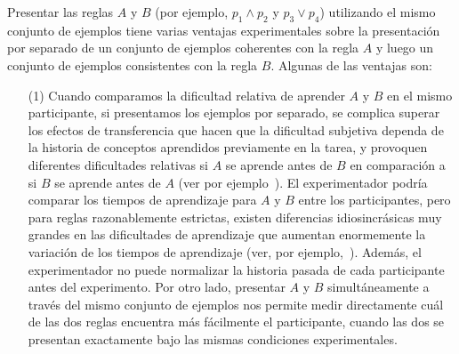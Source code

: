 Presentar las reglas $A$ y $B$ (por ejemplo, $p_1\land p_2$ y $p_3 \lor p_4$) utilizando el mismo conjunto de ejemplos tiene varias ventajas experimentales sobre la presentación por separado de un conjunto de ejemplos coherentes con la regla $A$ y luego un conjunto de ejemplos consistentes con la regla $B$. Algunas de las ventajas son:

\begin{enumerate}
\item [(1)] 
Cuando comparamos la dificultad relativa de aprender $A$ y $B$ en el mismo participante, si presentamos los ejemplos por separado, se complica superar los efectos de transferencia que hacen que la dificultad subjetiva dependa de la historia de conceptos aprendidos previamente en la tarea, y provoquen diferentes dificultades relativas si $A$ se aprende antes de $B$ en comparación a si $B$ se aprende antes de $A$ (ver por ejemplo~\cite{tano2020towards}). El experimentador podría comparar los tiempos de aprendizaje para $A$ y $B$ entre los participantes, pero para reglas razonablemente estrictas, existen diferencias idiosincrásicas muy grandes en las dificultades de aprendizaje que aumentan enormemente la variación de los tiempos de aprendizaje (ver, por ejemplo,~\cite{feldman2000minimization}). Además, el experimentador no puede normalizar la historia pasada de cada participante antes del experimento. Por otro lado, presentar $A$ y $B$ simultáneamente a través del mismo conjunto de ejemplos nos permite medir directamente cuál de las dos reglas encuentra más fácilmente el participante, cuando las dos se presentan exactamente bajo las mismas condiciones experimentales.


\end{enumerate}
